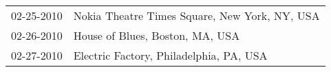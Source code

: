 \begin{supertabular}{ll}
 02-25-2010 &  Nokia Theatre Times Square, New York, NY, USA \\
 02-26-2010 &                House of Blues, Boston, MA, USA \\
 02-27-2010 &        Electric Factory, Philadelphia, PA, USA \\
\end{supertabular}
